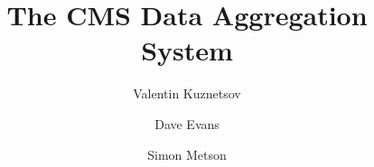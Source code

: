 \documentclass[a4paper]{jpconf}
\begin{document}
\title{The CMS Data Aggregation System}

\author{Valentin Kuznetsov}
\address{Cornell University, Ithaca, New York, USA}

\author{Dave Evans}
\address{Fermilab, Batavia, Illinois, USA}

\author{Simon Metson}
\address{Bristol University, Bristol, UK}


\end{document}
